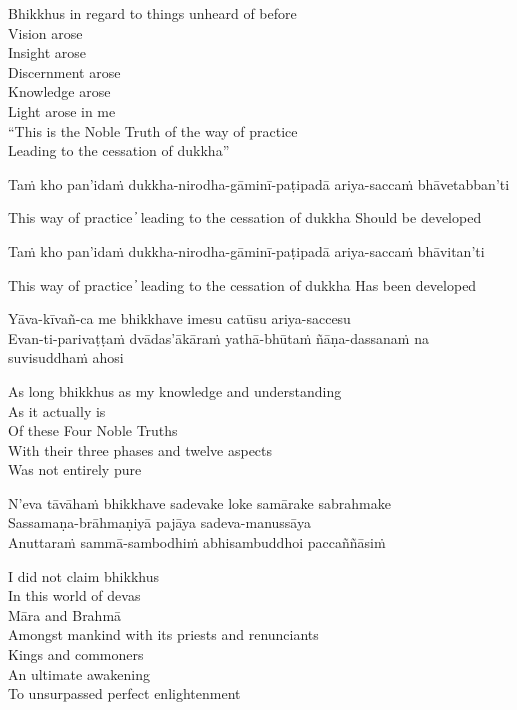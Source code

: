 \begin{cprenglish}
Bhikkhus in regard to things unheard of before\\
Vision arose\\
Insight arose\\
Discernment arose\\
Knowledge arose\\
Light arose in me\\
“This is the Noble Truth of the way of practice\\
Leading to the cessation of dukkha”
\end{cprenglish}

Taṁ kho pan’idaṁ dukkha-nirodha-gāminī-paṭipadā ariya-saccaṁ bhāvetabban’ti

\begin{cprenglish}
This way of practice  ̓  leading to the cessation of dukkha
Should be developed
\end{cprenglish}

Taṁ kho pan’idaṁ dukkha-nirodha-gāminī-paṭipadā ariya-saccaṁ bhāvitan’ti

\begin{cprenglish}
This way of practice  ̓  leading to the cessation of dukkha
Has been developed
\end{cprenglish}

Yāva-kīvañ-ca me bhikkhave imesu catūsu ariya-saccesu\\
Evan-ti-parivaṭṭaṁ dvādas’ākāraṁ yathā-bhūtaṁ ñāṇa-dassanaṁ na suvisuddhaṁ ahosi

\begin{cprenglish}
As long bhikkhus as my knowledge and understanding\\
As it actually is\\
Of these Four Noble Truths\\
With their three phases and twelve aspects\\
Was not entirely pure
\end{cprenglish}

N’eva tāvāhaṁ bhikkhave sadevake loke samārake sabrahmake\\
Sassamaṇa-brāhmaṇiyā pajāya sadeva-manussāya\\
Anuttaraṁ sammā-sambodhiṁ abhisambuddhoi paccaññāsiṁ

\begin{cprenglish}
I did not claim bhikkhus\\
In this world of devas\\
Māra and Brahmā\\
Amongst mankind with its priests and renunciants\\
Kings and commoners\\
An ultimate awakening\\
To unsurpassed perfect enlightenment
\end{cprenglish}

